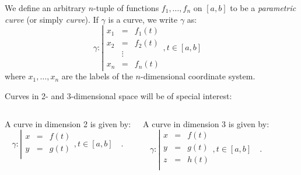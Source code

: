 \begin{frame}
\begin{definition}
We define an arbitrary $n$-tuple of functions $f_1,\dots, f_n$ on $[a,b]$ to be a \emph{parametric curve} (or simply \emph{curve}). If $\gamma$ is a curve, we write $\gamma$ as:
\[
\gamma:\left| 
\begin{array}{rcl}
x_1&=&f_1(t)\\
x_2&=&f_2(t)\\
&\vdots & \\
x_n&=&f_n(t)
\end{array} \right., t\in [a,b]\quad 
\]
where $x_1,\dots, x_n$ are the labels of the $n$-dimensional coordinate system.
\end{definition}
Curves in 2- and 3-dimensional space will be of special interest:
\begin{columns}
A curve in dimension 2 is given by:
\[
\gamma:\left| 
\begin{array}{rcl}
x&=&f(t)\\
y&=&g(t)\\
\end{array} \right., t\in [a,b]\quad .
\]

A curve in dimension 3 is given by:
\[
\gamma:\left| 
\begin{array}{rcl}
x&=&f(t)\\
y&=&g(t)\\
z&=&h(t)\\
\end{array} \right., t\in [a,b]\quad .
\]

\end{columns}

\end{frame}
